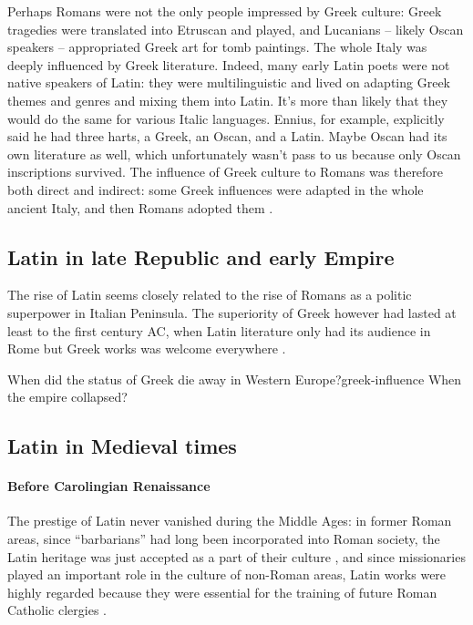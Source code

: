 \documentclass[a4paper, oneside, 12pt]{report}
\newcommand*{\citepage}[1]{p.~{#1}}
\newcommand*{\citepages}[1]{pp.~{#1}}
\begin{document}
Perhaps Romans were not the only people impressed by Greek culture:
Greek tragedies were translated into Etruscan and played,
and Lucanians -- likely Oscan speakers -- appropriated Greek art for tomb paintings.
The whole Italy was deeply influenced by Greek literature.
Indeed, many early Latin poets were not native speakers of Latin: 
they were multilinguistic and lived on adapting Greek themes and genres and mixing them into Latin.
It's more than likely that they would do the same for various Italic languages.
Ennius, for example, explicitly said he had three harts, a Greek, an Oscan, and a Latin.
Maybe Oscan had its own literature as well,
which unfortunately wasn't pass to us because only Oscan inscriptions survived.
The influence of Greek culture to Romans was therefore both direct and indirect:
some Greek influences were adapted in the whole ancient Italy,
and then Romans adopted them
\citep[\citepages{49-50}]{leonhardt2013latin}.



\subsection{Latin in late Republic and early Empire}

The rise of Latin seems closely related to the rise of Romans as a politic superpower
in Italian Peninsula.
The superiority of Greek however had lasted at least to the first century AC,
when Latin literature only had its audience in Rome
but Greek works was welcome everywhere
\citep[\citepage{52}]{leonhardt2013latin}. 

\begin{todobox}{When did the status of Greek die away in Western Europe?}{greek-influence}
    When the empire collapsed?
\end{todobox}

\subsection{Latin in Medieval times}

\paragraph*{Before Carolingian Renaissance}
The prestige of Latin never vanished during the Middle Ages:
in former Roman areas, since ``barbarians'' had long been incorporated into Roman society, 
the Latin heritage was just accepted as a part of their culture 
\citep[\citepage{137}]{leonhardt2013latin},
and since missionaries played an important role in the culture of non-Roman areas, 
Latin works were highly regarded because they were essential 
for the training of future Roman Catholic clergies
\citep[\citepage{138}]{leonhardt2013latin}.
\end{document}
